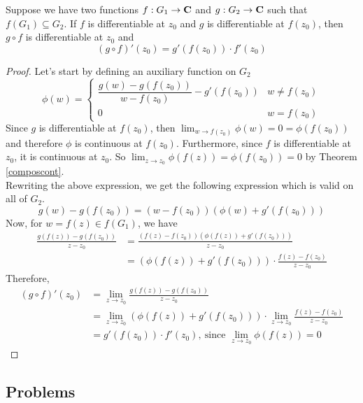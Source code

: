 \begin{proposition}
Suppose we have two functions $f:G_1 \to \mathbf C$ and $g: G_2 \to \mathbf C$ such that $f(G_1) \subseteq G_2$. If $f$ is differentiable at $z_0$ and $g$ is differentiable at $f(z_0)$, then $g\circ f$ is differentiable at $z_0$ and
\[(g\circ f)'(z_0) = g'(f(z_0))\cdot f'(z_0)\]
\end{proposition}
\begin{proof}
Let's start by defining an auxiliary function on $G_2$
\[\phi(w) = \begin{cases} \dfrac{g(w) - g(f(z_0))}{w - f(z_0)} - g'(f(z_0)) & w \neq f(z_0)\\[0.5em] 0 & w = f(z_0) \end{cases}\]
Since $g$ is differentiable at $f(z_0)$, then $\lim_{w \to f(z_0)}\phi(w) = 0 = \phi(f(z_0))$ and therefore $\phi$ is continuous at $f(z_0)$. Furthermore, since $f$ is differentiable at $z_0$, it is continuous at $z_0$. So $\lim_{z \to z_0}\phi(f(z)) = \phi(f(z_0)) = 0$ by Theorem \ref{composcont}.\\[1em]
Rewriting the above expression, we get the following expression which is valid on all of $G_2$.
\[g(w) - g(f(z_0)) = (w - f(z_0))(\phi(w) + g'(f(z_0)))\]
Now, for $w = f(z) \in f(G_1)$, we have
\begin{align*}
\frac{g(f(z)) - g(f(z_0))}{z - z_0} &= \frac{(f(z) - f(z_0))(\phi(f(z)) + g'(f(z_0)))}{z - z_0}\\[0.5em]
&= (\phi(f(z)) + g'(f(z_0)))\cdot\frac{f(z) - f(z_0)}{z - z_0}
\end{align*}
Therefore, 
\begin{align*}
(g\circ f)'(z_0) &= \lim_{z \to z_0}\frac{g(f(z)) - g(f(z_0))}{z - z_0}\\[0.5em]
&= \lim_{z \to z_0}(\phi(f(z)) + g'(f(z_0)))\cdot\lim_{z \to z_0}\frac{f(z) - f(z_0)}{z - z_0}\\[1em]
&= g'(f(z_0))\cdot f'(z_0),\ \text{since $\lim_{z \to z_0}\phi(f(z)) = 0$}
\end{align*}
\end{proof}

\vspace*{0.2in}

\subsection{Problems}
\vspace{0.1in}

